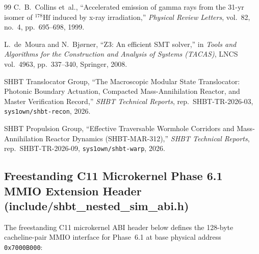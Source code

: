 \documentclass[11pt,onecolumn]{article}
\begin{document}
\begin{thebibliography}{99}
C.~B.~Collins et~al.,
``Accelerated emission of gamma rays from the 31-yr isomer of $^{178}\text{Hf}$ induced by x-ray irradiation,''
\emph{Physical Review Letters}, vol.~82, no.~4, pp.~695--698, 1999.

L.~de~Moura and N.~Bj{\o}rner,
``Z3: An efficient SMT solver,''
in \emph{Tools and Algorithms for the Construction and Analysis of Systems (TACAS)}, LNCS vol.~4963, pp.~337--340, Springer, 2008.

SHBT Translocator Group,
``The Macroscopic Modular State Translocator: Photonic Boundary Actuation, Compacted Mass-Annihilation Reactor, and Master Verification Record,''
\emph{SHBT Technical Reports}, rep.~SHBT-TR-2026-03, \texttt{sys1own/shbt-recon}, 2026.

SHBT Propulsion Group,
``Effective Traversable Wormhole Corridors and Mass-Annihilation Reactor Dynamics (SHBT-MAR-312),''
\emph{SHBT Technical Reports}, rep.~SHBT-TR-2026-09, \texttt{sys1own/shbt-warp}, 2026.
\end{thebibliography}


\subsection{Freestanding C11 Microkernel Phase 6.1 MMIO Extension Header (include/shbt\_nested\_sim\_abi.h)}
\label{sec:nested_sim_header}
The freestanding C11 microkernel ABI header below defines the 128-byte cacheline-pair MMIO interface for Phase~6.1 at base physical address \texttt{0x7000B000}:
\end{document}
